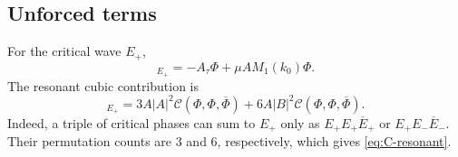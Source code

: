 \documentclass[11pt]{article}
\newcommand{\cC}{\mathcal{C}}
\begin{document}
\subsection{Unforced terms}

For the critical wave $E_+$,
\begin{equation}
 [F_{0,\mathrm{lin}}^{(3)}]_{E_+}
 =-A_\tau\Phi+\mu A M_1(k_0)\Phi.
 \label{eq:unforced-linear-plus}
\end{equation}
The resonant cubic contribution is
\begin{equation}
 [\cC(u_1,u_1,u_1)]_{E_+}
 =3A|A|^2\cC(\Phi,\Phi,\overline\Phi)
 +6A|B|^2\cC(\Phi,\Phi,\overline\Phi).
 \label{eq:C-resonant}
\end{equation}
Indeed, a triple of critical phases can sum to $E_+$ only as
$E_+E_+\overline E_+$ or $E_+E_-\overline E_-$.  Their permutation counts
are $3$ and $6$, respectively, which gives \eqref{eq:C-resonant}.
\end{document}
